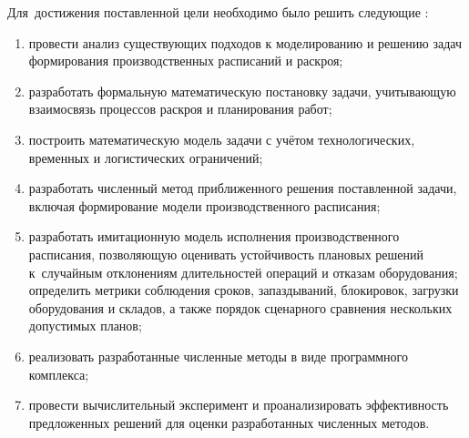 Для~достижения поставленной цели необходимо было решить следующие {\tasks}:
\begin{enumerate}[beginpenalty=10000] %
  \item провести анализ существующих подходов к моделированию и решению
  задач формирования производственных расписаний и раскроя;
  \item разработать формальную математическую постановку задачи,
  учитывающую взаимосвязь процессов раскроя и планирования работ;
  \item построить математическую модель задачи с учётом
  технологических, временных и логистических ограничений;
  \item разработать численный метод приближенного решения поставленной задачи,
  включая формирование модели производственного расписания;
  \item разработать имитационную модель исполнения производственного
  расписания, позволяющую оценивать устойчивость плановых решений
  к~случайным отклонениям длительностей операций и отказам оборудования;
  определить метрики соблюдения сроков, запаздываний, блокировок,
  загрузки оборудования и складов, а также порядок сценарного сравнения
  нескольких допустимых планов;
  \item реализовать разработанные численные методы в виде программного комплекса;
  \item провести вычислительный эксперимент и проанализировать
  эффективность предложенных решений для оценки разработанных численных методов.
\end{enumerate}


